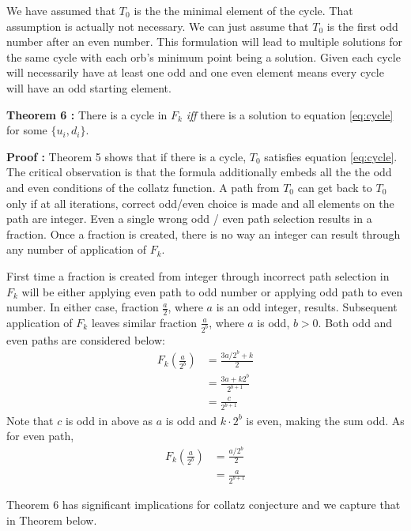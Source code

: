 \documentclass[12pt]{article} %
\begin{document}
We have assumed that $T_0$ is the the minimal element of the cycle. That assumption is actually not necessary. We can just assume that $T_0$ is the first odd number after an even number. This formulation will lead to multiple solutions for the same cycle with each orb's minimum point being a solution. Given each cycle will necessarily have at least one odd and one even element means every cycle will have an odd starting element.
\newline

\textbf{Theorem 6 :}
There is a cycle in $F_k$ \textit{iff} there is a solution to equation \eqref{eq:cycle} for some $\{u_i,d_i\}$.

\textbf{Proof :}
Theorem 5 shows that if there is a cycle, $T_0$ satisfies equation \eqref{eq:cycle}. The critical observation is that the formula additionally embeds all the the odd and even conditions of the collatz function. A path from $T_0$ can get back to $T_0$ only if at all iterations, correct odd/even choice is made and all elements on the path are integer. Even a single wrong odd / even path selection results in a fraction. Once a fraction is created, there is no way an integer can result through any number of application of $F_k$. 

First time a fraction is created from integer through incorrect path selection in $F_k$ will be either applying even path to odd number or applying odd path to even number. In either case, fraction $\frac{a}{2}$, where $a$ is an odd integer, results. Subsequent application of $F_k$ leaves similar fraction $\frac{a}{2^b}$, where $a$ is odd, $b > 0$. Both odd and even paths are considered below:
\begin{align*}
    F_k(\frac{a}{2^b})  & = \frac{3a/2^b + k}{2} \\
                        & = \frac{3a + k 2^b}{2^{b+1}}\\
                        & = \frac{c}{2^{b+1}}
\end{align*}
Note that $c$ is odd in above as $a$ is odd and $k \cdot 2^b$ is even, making the sum odd. As for even path, 
\begin{align*}
   F_k( \frac{a}{2^b}) & = \frac{a/2^b}{2}\\
                      & = \frac{a}{2^{b+1}}
\end{align*}

Theorem 6 has significant implications for collatz conjecture and we capture that in Theorem below.
\newline
\end{document}
